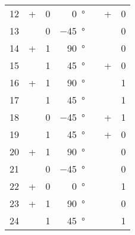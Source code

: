 \begin{longtable}[c]{rccrccc}
	12\hspace{1.5em} &      + & 0 & \qty{  0}{\degree}\hspace{1.5em} &  &      + & 0 \\
	13\hspace{1.5em} & \times & 0 & \qty{-45}{\degree}\hspace{1.5em} &  & \times & 0 \\
	14\hspace{1.5em} &      + & 1 & \qty{ 90}{\degree}\hspace{1.5em} &  & \times & 0 \\
	15\hspace{1.5em} & \times & 1 & \qty{ 45}{\degree}\hspace{1.5em} &  &      + & 0 \\
	16\hspace{1.5em} &      + & 1 & \qty{ 90}{\degree}\hspace{1.5em} &  & \times & 1 \\
	17\hspace{1.5em} & \times & 1 & \qty{ 45}{\degree}\hspace{1.5em} &  & \times & 1 \\
	18\hspace{1.5em} & \times & 0 & \qty{-45}{\degree}\hspace{1.5em} &  &      + & 1 \\
	19\hspace{1.5em} & \times & 1 & \qty{ 45}{\degree}\hspace{1.5em} &  &      + & 0 \\
	20\hspace{1.5em} &      + & 1 & \qty{ 90}{\degree}\hspace{1.5em} &  & \times & 0 \\
	21\hspace{1.5em} & \times & 0 & \qty{-45}{\degree}\hspace{1.5em} &  & \times & 0 \\
	22\hspace{1.5em} &      + & 0 & \qty{  0}{\degree}\hspace{1.5em} &  & \times & 1 \\
	23\hspace{1.5em} &      + & 1 & \qty{ 90}{\degree}\hspace{1.5em} &  & \times & 0 \\
	24\hspace{1.5em} & \times & 1 & \qty{ 45}{\degree}\hspace{1.5em} &  & \times & 1 \\

\end{longtable}
